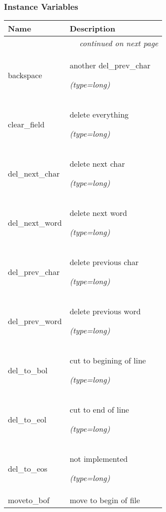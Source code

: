   \subsubsection{Instance Variables}

    \vspace{-1cm}
\hspace{\varindent}\begin{longtable}{|p{\varnamewidth}|p{\vardescrwidth}|l}
\cline{1-2}
\cline{1-2} \centering \textbf{Name} & \centering \textbf{Description}& \\
\cline{1-2}
\endhead\cline{1-2}\multicolumn{3}{r}{\small\textit{continued on next page}}\\\endfoot\cline{1-2}
\endlastfoot\raggedright b\-a\-c\-k\-s\-p\-a\-c\-e\- & \raggedright another  del\_prev\_char

            {\it (type=long)}&\\
\cline{1-2}
\raggedright c\-l\-e\-a\-r\-\_\-f\-i\-e\-l\-d\- & \raggedright delete everything

            {\it (type=long)}&\\
\cline{1-2}
\raggedright d\-e\-l\-\_\-n\-e\-x\-t\-\_\-c\-h\-a\-r\- & \raggedright delete next char

            {\it (type=long)}&\\
\cline{1-2}
\raggedright d\-e\-l\-\_\-n\-e\-x\-t\-\_\-w\-o\-r\-d\- & \raggedright delete next word

            {\it (type=long)}&\\
\cline{1-2}
\raggedright d\-e\-l\-\_\-p\-r\-e\-v\-\_\-c\-h\-a\-r\- & \raggedright delete previous char

            {\it (type=long)}&\\
\cline{1-2}
\raggedright d\-e\-l\-\_\-p\-r\-e\-v\-\_\-w\-o\-r\-d\- & \raggedright delete previous word

            {\it (type=long)}&\\
\cline{1-2}
\raggedright d\-e\-l\-\_\-t\-o\-\_\-b\-o\-l\- & \raggedright cut to begining of line

            {\it (type=long)}&\\
\cline{1-2}
\raggedright d\-e\-l\-\_\-t\-o\-\_\-e\-o\-l\- & \raggedright cut to end of line

            {\it (type=long)}&\\
\cline{1-2}
\raggedright d\-e\-l\-\_\-t\-o\-\_\-e\-o\-s\- & \raggedright not implemented

            {\it (type=long)}&\\
\cline{1-2}
\raggedright m\-o\-v\-e\-t\-o\-\_\-b\-o\-f\- & \raggedright move to begin of file


\end{longtable}
